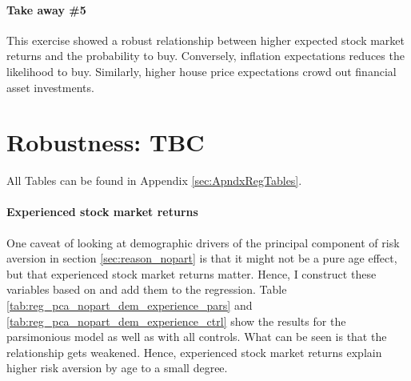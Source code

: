 \documentclass[ProjectABM]{subfiles}
\begin{document}




\paragraph{Take away \#5}
This exercise showed a robust relationship between higher expected stock market returns and the probability to buy. Conversely, inflation expectations reduces the likelihood to buy. Similarly, higher house price expectations crowd out financial asset investments.

\section{Robustness: TBC}\label{sec:robustness}
All Tables can be found in Appendix \ref{sec:ApndxRegTables}.

\paragraph{Experienced stock market returns}
One caveat of looking at demographic drivers of the principal component of risk aversion in section \ref{sec:reason_nopart} is that it might not be a pure age effect, but that experienced stock market returns matter. Hence, I construct these variables based on \cite{malmendier_2011} and add them to the regression.
Table \ref{tab:reg_pca_nopart_dem_experience_pars} and \ref{tab:reg_pca_nopart_dem_experience_ctrl} show the results for the parsimonious model as well as with all controls. What can be seen is that the relationship gets weakened. Hence, experienced stock market returns explain higher risk aversion by age to a small degree.
\end{document}

